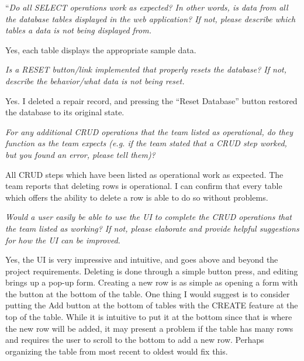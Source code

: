 \documentclass{article}
\begin{document}
\begin{tcolorbox}[colback=secondarycolor, colframe=primarycolor, title=\textbf{Step 4: Peer Review 3 - Drew Schlabach}]
``\textit{Do all SELECT operations work as expected? In other words, is data from all the database tables displayed in the web application? If not, please describe which tables a data is not being displayed from.}

\vspace{0.05cm}
Yes, each table displays the appropriate sample data.

\vspace{0.2cm}
\textit{Is a RESET button/link implemented that properly resets the database? If not, describe the behavior/what data is not being reset.}

\vspace{0.05cm}
Yes. I deleted a repair record, and pressing the “Reset Database” button restored the database to its original state.

\vspace{0.2cm}
\textit{For any additional CRUD operations that the team listed as operational, do they function as the team expects (e.g. if the team stated that a CRUD step worked, but you found an error, please tell them)?}

\vspace{0.05cm}
All CRUD steps which have been listed as operational work as expected. The team reports that deleting rows is operational. I can confirm that every table which offers the ability to delete a row is able to do so without problems. 

\vspace{0.2cm}
\textit{Would a user easily be able to use the UI to complete the CRUD operations that the team listed as working? If not, please elaborate and provide helpful suggestions for how the UI can be improved.}

\vspace{0.05cm}
Yes, the UI is very impressive and intuitive, and goes above and beyond the project requirements. Deleting is done through a simple button press, and editing brings up a pop-up form. Creating a new row is as simple as opening a form with the button at the bottom of the table. One thing I would suggest is to consider putting the Add button at the bottom of tables with the CREATE feature at the top of the table. While it is intuitive to put it at the bottom since that is where the new row will be added, it may present a problem if the table has many rows and requires the user to scroll to the bottom to add a new row. Perhaps organizing the table from most recent to oldest would fix this.


\end{tcolorbox}
\end{document}
